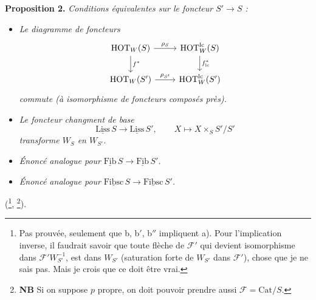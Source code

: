 \documentclass[11pt]{article}
\newcommand{\printedpage}[1]{\marginpar{\footnotesize p.~#1}}
\newcommand{\msp}[1]{\marginpar{\footnotesize [#1]}}
\newcommand{\und}[1]{\underline{\mathrm{#1}}}
\newcommand{\HOT}{\mathrm{HOT}}
\newcommand{\Cat}{\mathrm{Cat}}
\begin{document}
\textbf{Proposition 2.} \textit{Conditions équivalentes sur le foncteur $S' \longrightarrow S$ :}

\begin{itemize}
\item[\textit{a)}] \textit{Le diagramme de foncteurs}
\[
\begin{tikzcd}
\HOT_W(S) \arrow[r, "\rho_S"] \arrow[d, "f^*"] & \HOT_W^{\mathrm{lc}}(S) \arrow[d, "f^*_{\mathrm{lc}}"] \\
\HOT_W(S') \arrow[r, "\rho_{S'}"] & \HOT_W^{\mathrm{lc}}(S')
\end{tikzcd}
\]
\textit{commute (à isomorphisme de foncteurs composés près).}

\msp{page 124}

\item[\textit{b)}] \textit{Le foncteur changment de base} %
\[
\und{Liss}\,S \longrightarrow \und{Liss}\,S', \qquad X \longmapsto X \times_S S'/S'
\]
\textit{transforme $W_S$ en $W_{S'}$.}
\printedpage{77}
\item[\textit{b$'$)}] \textit{Énoncé analogue pour} $\und{Fib}\,S \longrightarrow \und{Fib}\,S'$\textit{.}
\item[\textit{b$''$)}] \textit{Énoncé analogue pour} $\und{Fibsc}\,S \longrightarrow \und{Fibsc}\,S'$\textit{.}
\end{itemize}

(\footnote[63]{Pas prouvée, seulement que b, b$'$, b$''$ impliquent a). Pour l'implication inverse, il faudrait savoir que toute flèche de $\mathcal{F}'$ qui devient isomorphisme dans $\mathcal{F}'W_{S'}^{-1}$, est dans $W_{S'}$ (saturation forte de $W_{S'}$ dans $\mathcal{F}'$), chose que je ne sais pas. Mais je crois que ce doit être vrai.}, \footnote[64]{\textbf{NB} Si on suppose $p$ propre, on doit pouvoir prendre aussi $\mathcal{F} = \Cat/S$.}).
\end{document}
